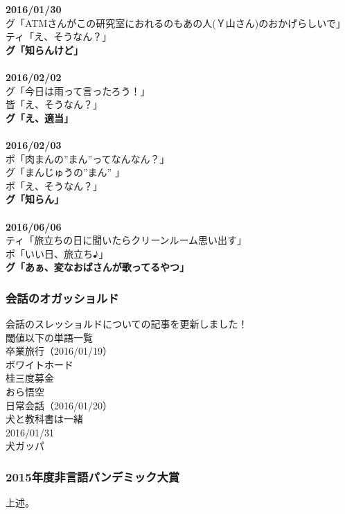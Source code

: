 {\bf 2016/01/30}\\
グ「ATMさんがこの研究室におれるのもあの人(Ｙ山さん)のおかげらしいで」 \\
ティ「え、そうなん？」 \\
{\Large {\bf グ「知らんけど」}}\\
 \\
{\bf 2016/02/02}\\
グ「今日は雨って言ったろう！」 \\
皆「え、そうなん？」 \\
{\Large {\bf グ「え、適当」}}\\
 \\
{\bf 2016/02/03}\\
ポ「肉まんの”まん”ってなんなん？」\\
グ「まんじゅうの”まん” 」\\
ポ「え、そうなん？」 \\
{\Large {\bf グ「知らん」}}\\
 \\
{\bf 2016/06/06}\\
ティ「旅立ちの日に聞いたらクリーンルーム思い出す」 \\
ポ「いい日、旅立ち♪」 \\
{\Large {\bf グ「あぁ、変なおばさんが歌ってるやつ」}}\\

\subsubsection{会話のオガッショルド}
会話のスレッショルドについての記事を更新しました！\\
閾値以下の単語一覧\\
卒業旅行（2016/01/19）\\
ボワイトホード\\
桂三度募金\\
おら悟空\\
日常会話（2016/01/20）\\
犬と教科書は一緒\\
2016/01/31\\
犬ガッパ\\

\subsubsection{2015年度非言語パンデミック大賞}
上述。

